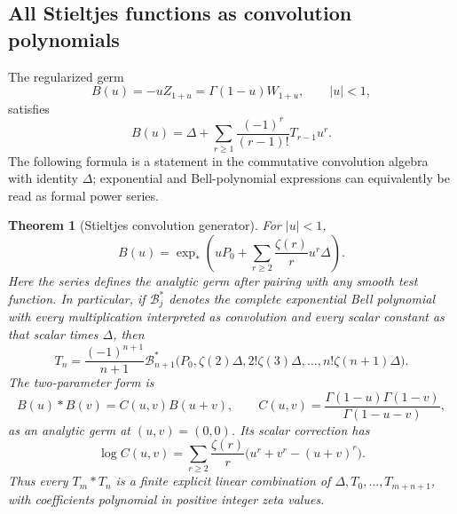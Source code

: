\documentclass[11pt,letterpaper]{article}
\numberwithin{equation}{section}
\theoremstyle{plain}
\newtheorem{theorem}{Theorem}[section]
\theoremstyle{definition}
\theoremstyle{remark}
\begin{document}
\subsection{All Stieltjes functions as convolution polynomials}

The regularized germ
\begin{equation}\label{per:eq:B}
 B(u)=-uZ_{1+u}=\Gamma(1-u)W_{1+u},\qquad |u|<1,
\end{equation}
satisfies
\begin{equation}\label{per:eq:Bseries}
 B(u)=\Delta+
       \sum_{r\ge1}\frac{(-1)^r}{(r-1)!}T_{r-1}u^r.
\end{equation}
The following formula is a statement in the commutative convolution
algebra with identity $\Delta$; exponential and Bell-polynomial
expressions can equivalently be read as formal power series.

\begin{theorem}[Stieltjes convolution generator]
\label{per:thm:Bell}
For $|u|<1$,
\begin{equation}\label{per:eq:exp}
 B(u)=\exp_*\left(uP_0+
                    \sum_{r\ge2}\frac{\zeta(r)}{r}u^r\Delta\right).
\end{equation}
Here the series defines the analytic germ after pairing with any smooth
test function. In particular, if $\mathcal B_j^*$ denotes the complete
exponential Bell polynomial with every multiplication interpreted as
convolution and every scalar constant as that scalar times $\Delta$,
then
\begin{equation}\label{per:eq:Bell}
 T_n=\frac{(-1)^{n+1}}{n+1}
 \mathcal B_{n+1}^*
 \bigl(P_0,\zeta(2)\Delta,2!\zeta(3)\Delta,
                         \ldots,n!\zeta(n+1)\Delta\bigr).
\end{equation}
The two-parameter form is
\begin{equation}\label{per:eq:Bconv}
 B(u)*B(v)=C(u,v)B(u+v),
 \qquad C(u,v)=\frac{\Gamma(1-u)\Gamma(1-v)}{\Gamma(1-u-v)},
\end{equation}
as an analytic germ at $(u,v)=(0,0)$. Its scalar correction has
\begin{equation}\label{per:eq:C}
 \log C(u,v)=\sum_{r\ge2}\frac{\zeta(r)}{r}
                   \bigl(u^r+v^r-(u+v)^r\bigr).
\end{equation}
Thus every $T_m*T_n$ is a finite explicit linear combination of
$\Delta,T_0,\ldots,T_{m+n+1}$, with coefficients polynomial in positive
integer zeta values.
\end{theorem}
\end{document}
